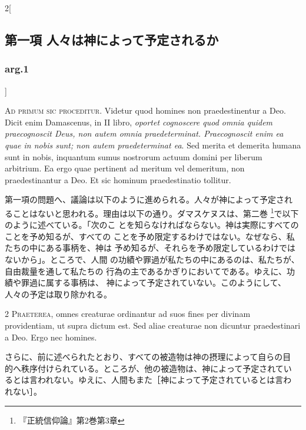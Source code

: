 \documentclass[paper=a4paper,fontsize=10pt,jafontsize=9pt,titlepage]{jlreq}
\begin{document}
\newpage


{}
\setcounter{section}{23}
\setcounter{subsection}{0}


\begin{paracol}{2}[\subsection{第一項 人々は神によって予定されるか}\subsubsection{arg.1}]

{\Huge A}{\scshape d primum sic proceditur}. Videtur quod
homines non praedestinentur a Deo. Dicit enim Damascenus, in II libro,
{\itshape oportet cognoscere quod omnia quidem praecognoscit Deus, non autem omnia
praedeterminat. Praecognoscit enim ea quae in nobis sunt; non autem
praedeterminat ea}. Sed merita et demerita humana sunt in nobis,
inquantum sumus nostrorum actuum domini per liberum arbitrium. Ea ergo
quae pertinent ad meritum vel demeritum, non praedestinantur a Deo. Et
sic hominum praedestinatio tollitur.


\switchcolumn


第一項の問題へ、議論は以下のように進められる。人々が神によって予定され
ることはないと思われる。理由は以下の通り。ダマスケヌスは、第二巻
\footnote{『正統信仰論』第2巻第3章}で以下のように述べている。「次のこ
とを知らなければならない。神は実際にすべてのことを予め知るが、すべての
ことを予め限定するわけではない。なぜなら、私たちの中にある事柄を、神は
予め知るが、それらを予め限定しているわけではないから」。ところで、人間
の功績や罪過が私たちの中にあるのは、私たちが、自由裁量を通して私たちの
行為の主であるかぎりにおいてである。ゆえに、功績や罪過に属する事柄は、
神によって予定されていない。このようにして、人々の予定は取り除かれる。




{\scshape 2 Praeterea}, omnes creaturae ordinantur ad
suos fines per divinam providentiam, ut supra dictum est. Sed aliae
creaturae non dicuntur praedestinari a Deo. Ergo nec homines.


\switchcolumn


さらに、前に述べられたとおり、すべての被造物は神の摂理によって自らの目
的へ秩序付けられている。ところが、他の被造物は、神によって予定されてい
るとは言われない。ゆえに、人間もまた［神によって予定されているとは言わ
れない］。



\end{paracol}
\end{document}
